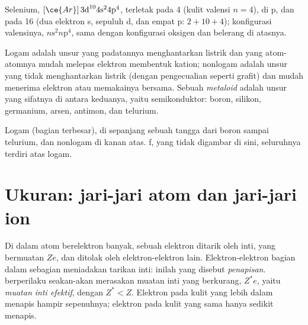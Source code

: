 \begin{example}\label{ex:b1:periodicity:position}
Selenium, $[\ce{Ar}]\,3\text{d}^{10} 4\text{s}^2 4\text{p}^4$, terletak
pada  4 (kulit valensi $n = 4$), di  p, dan pada  16
(dua elektron s, sepuluh d, dan empat p: $2 + 10 + 4$); konfigurasi
valensinya, $n\text{s}^2 n\text{p}^4$, sama dengan konfigurasi oksigen
dan belerang di atasnya.
\end{example}

\begin{definition}\label{def:b1:periodicity:metalloid}
Logam adalah unsur yang padatannya menghantarkan listrik dan yang
atom-atomnya mudah melepas elektron membentuk kation; nonlogam adalah
unsur yang tidak menghantarkan listrik (dengan pengecualian seperti
grafit) dan mudah menerima elektron atau memakainya bersama. Sebuah
\emph{metaloid} adalah unsur yang sifatnya di antara
keduanya, yaitu semikonduktor: boron, silikon, germanium, arsen,
antimon, dan telurium.
\end{definition}

\begin{omfigure}
\omperiodictable[colour=metals, legend, f block=false]

{\small Logam (bagian terbesar),  di sepanjang sebuah tangga dari
boron sampai telurium, dan nonlogam di kanan atas.  f, yang tidak
digambar di sini, seluruhnya terdiri atas logam.}
\end{omfigure}

\section{Ukuran: jari-jari atom dan jari-jari ion}

\begin{definition}\label{def:b1:periodicity:screening}
Di dalam atom berelektron banyak, sebuah elektron ditarik oleh inti, yang
bermuatan $Ze$, dan ditolak oleh elektron-elektron lain. Elektron-elektron
bagian dalam sebagian meniadakan tarikan inti: inilah yang disebut
\emph{penapisan}.  berperilaku
seakan-akan merasakan muatan inti yang berkurang, $Z^{*}e$, yaitu
\emph{muatan inti efektif}, dengan
$Z^{*} < Z$. Elektron pada kulit yang lebih dalam menapis hampir
sepenuhnya; elektron pada kulit yang sama hanya sedikit menapis.
\end{definition}

